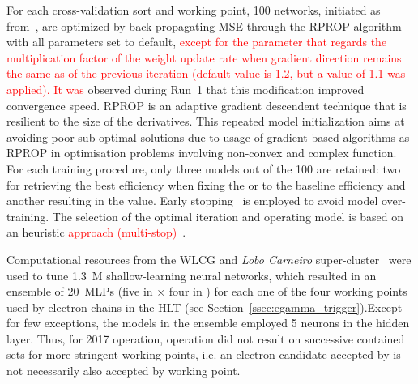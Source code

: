 For each cross-validation sort and working point, 100 networks, initiated
as from~\cite{initnw}, are optimized by back-propagating MSE through the RPROP
algorithm~\cite{rprop} with all parameters set to default,
\textcolor{red}{except for the parameter that regards the multiplication factor of the weight update rate when gradient direction remains the same as of the previous iteration (default value is 1.2, but a value of 1.1 was applied). It was }
observed during Run~1 that this modification improved convergence speed. RPROP
is an adaptive gradient descendent technique that is resilient to the size of
the derivatives. This repeated model initialization aims at
avoiding poor sub-optimal solutions due to usage of gradient-based algorithms as
RPROP in optimisation problems involving non-convex and complex function.
For each training procedure, only three models out of the 100 are retained: two
for retrieving the best efficiency when fixing the \pd{} or \pf{} to the
baseline \fastcalo{} efficiency and another resulting in the \spmax{} value.
Early stopping~\cite{haykin_2008} is employed to avoid model over-training. The
selection of the optimal iteration and operating model is based on an heuristic \textcolor{red}{approach (multi-stop)~\cite{Goodfellow2016}}.


Computational resources from the WLCG and \emph{Lobo Carneiro}
super-cluster~\cite{lobo_carneiro} were used to tune 1.3~M shallow-learning
neural networks, which resulted in an ensemble of \SI{20}{MLPs} (five in \et{}
$\times$ four in \abseta{})  for each one of the four working points used by
electron chains in the HLT (see Section~\ref{ssec:egamma_trigger}).\@ Except 
for few exceptions, the models in the ensemble employed 5 neurons in the 
hidden layer.  Thus, for 2017 operation, 
\rnn{} operation did not result on
successive contained sets for more stringent working points, i.e. an electron
candidate accepted by \medium{} is not necessarily also accepted by \loose{}
working point. %


